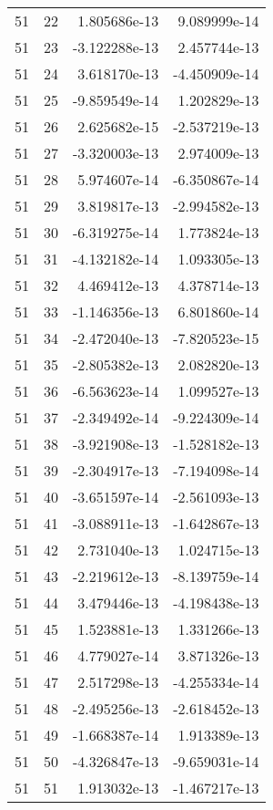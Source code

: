 \begin{tabular}{rrrr}
  51 &   22 &  1.805686e-13 &  9.089999e-14 \\
  51 &   23 & -3.122288e-13 &  2.457744e-13 \\
  51 &   24 &  3.618170e-13 & -4.450909e-14 \\
  51 &   25 & -9.859549e-14 &  1.202829e-13 \\
  51 &   26 &  2.625682e-15 & -2.537219e-13 \\
  51 &   27 & -3.320003e-13 &  2.974009e-13 \\
  51 &   28 &  5.974607e-14 & -6.350867e-14 \\
  51 &   29 &  3.819817e-13 & -2.994582e-13 \\
  51 &   30 & -6.319275e-14 &  1.773824e-13 \\
  51 &   31 & -4.132182e-14 &  1.093305e-13 \\
  51 &   32 &  4.469412e-13 &  4.378714e-13 \\
  51 &   33 & -1.146356e-13 &  6.801860e-14 \\
  51 &   34 & -2.472040e-13 & -7.820523e-15 \\
  51 &   35 & -2.805382e-13 &  2.082820e-13 \\
  51 &   36 & -6.563623e-14 &  1.099527e-13 \\
  51 &   37 & -2.349492e-14 & -9.224309e-14 \\
  51 &   38 & -3.921908e-13 & -1.528182e-13 \\
  51 &   39 & -2.304917e-13 & -7.194098e-14 \\
  51 &   40 & -3.651597e-14 & -2.561093e-13 \\
  51 &   41 & -3.088911e-13 & -1.642867e-13 \\
  51 &   42 &  2.731040e-13 &  1.024715e-13 \\
  51 &   43 & -2.219612e-13 & -8.139759e-14 \\
  51 &   44 &  3.479446e-13 & -4.198438e-13 \\
  51 &   45 &  1.523881e-13 &  1.331266e-13 \\
  51 &   46 &  4.779027e-14 &  3.871326e-13 \\
  51 &   47 &  2.517298e-13 & -4.255334e-14 \\
  51 &   48 & -2.495256e-13 & -2.618452e-13 \\
  51 &   49 & -1.668387e-14 &  1.913389e-13 \\
  51 &   50 & -4.326847e-13 & -9.659031e-14 \\
  51 &   51 &  1.913032e-13 & -1.467217e-13 \\

\end{tabular}
